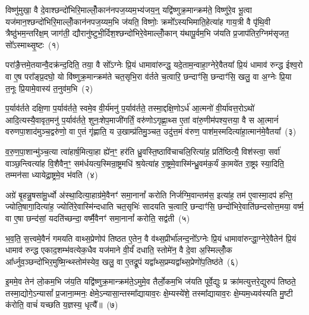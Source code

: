 \setcounter{anuvakam}{0}
विष्णु॑मुखा॒ वै दे॒वाश्छन्दो॑भिरि॒माल्लोँ॒कान॑नपज॒य्यम॒भ्य॑जय॒न्॒ यद्वि॑ष्णुक्र॒मान्क्रम॑ते॒ विष्णु॑रे॒व भू॒त्वा यज॑मान॒श्छन्दो॑भिरि॒माल्लोँ॒कान॑नपज॒य्यम॒भि ज॑यति॒ विष्णोः॒ क्रमो᳚\-ऽस्यभिमाति॒हेत्या॑ह गाय॒त्री वै पृ॑थि॒वी त्रैष्ठु॑भम॒न्तरि॑क्ष॒म् जाग॑ती॒ द्यौरानु॑ष्टुभी॒र्दिश॒श्छन्दो॑भिरे॒वेमाल्लोँ॒कान् य॑थापू॒र्वम॒भि ज॑यति प्र॒जाप॑तिर॒ग्निम॑सृजत॒ सो᳚\-ऽस्माथ्सृ॒ष्टः~(१)

परा॑ङै॒त्तमे॒तयान्वै॒दक्र॑न्द॒दिति॒ तया॒ वै सो᳚\-ऽग्नेः प्रि॒यं धामावा॑रुन्द्ध॒ यदे॒ताम॒न्वाहा॒ग्नेरे॒वैतया᳚ प्रि॒यं धामाव॑ रुन्द्ध ईश्व॒रो वा ए॒ष परा᳚ङ्प्र॒दघो॒ यो वि॑ष्णुक्र॒मान्क्रम॑ते चत॒सृभि॒रा व॑र्तते च॒त्वारि॒ छन्दाꣳ॑सि॒ छन्दाꣳ॑सि॒ खलु॒ वा अ॒ग्नेः प्रि॒या त॒नूः प्रि॒यामे॒वास्य॑ त॒नुव॑म॒भि~(२)

प॒र्याव॑र्तते दक्षि॒णा प॒र्याव॑र्तते॒ स्वमे॒व वी॒र्य॑मनु॑ प॒र्याव॑र्तते॒ तस्मा॒द्दक्षि॒णो\-ऽर्ध॑ आ॒त्मनो॑ वी॒र्या॑वत्त॒रो\-ऽथो॑ आदि॒त्यस्यै॒वावृत॒मनु॑ प॒र्याव॑र्तते॒ शुनः॒शेप॒माजी॑गर्तिं॒ वरु॑णो\-ऽगृह्णा॒थ्स ए॒तां वा॑रु॒णीम॑पश्य॒त्तया॒ वै स आ॒त्मानं॑ वरुणपा॒शाद॑मुञ्च॒द्वरु॑णो॒ वा ए॒तं गृ॑ह्णाति॒ य उ॒खाम्प्र॑तिमु॒ञ्चत॒ उदु॑त्त॒मं व॑रुण॒ पाश॑म॒स्मदित्या॑हा॒त्मान॑मे॒वैतया᳚~(३)

व॒रु॒ण॒पा॒शान्मु॑ञ्च॒त्या त्वा॑हार्\mbox{}ष॒मित्या॒हा ह्ये॑न॒ꣳ॒ हर॑ति ध्रु॒वस्ति॒ष्ठावि॑चाचलि॒रित्या॑ह॒ प्रति॑ष्ठित्यै॒ विश॑स्त्वा॒ सर्वा॑ वाञ्छ॒न्त्वित्या॑ह वि॒शैवैन॒ꣳ॒ सम॑र्धयत्य॒स्मिन्रा॒ष्ट्रमधि॑ श्र॒येत्या॑ह रा॒ष्ट्रमे॒वास्मि॑न्ध्रु॒वम॑क॒र्यं का॒मये॑त रा॒ष्ट्रꣴ स्या॒दिति॒ तम्मन॑सा ध्यायेद्रा॒ष्ट्रमे॒व भ॑वति~(४)

अग्रे॑ बृ॒हन्नु॒षसा॑मू॒र्ध्वो अ॑स्था॒दित्या॒हाग्र॑मे॒वैनꣳ॑ समा॒नानां᳚ करोति निर्जग्मि॒वान्तम॑स॒ इत्या॑ह॒ तम॑ ए॒वास्मा॒दप॑ हन्ति॒ ज्योति॒षागा॒दित्या॑ह॒ ज्योति॑रे॒वास्मि॑न्दधाति चत॒सृभिः॑ सादयति च॒त्वारि॒ छन्दाꣳ॑सि॒ छन्दो॑भिरे॒वाति॑छन्दसोत्त॒मया॒ वर्ष्म॒ वा ए॒षा छन्द॑सां॒ यदति॑च्छन्दा॒ वर्ष्मै॒वैनꣳ॑ समा॒नानां᳚ करोति॒ सद्व॑ती~(५)

भ॒व॒ति॒ स॒त्त्वमे॒वैनं॑ गमयति वाथ्स॒प्रेणोप॑ तिष्ठत ए॒तेन॒ वै व॑थ्स॒प्रीर्भा॑लन्द॒नो᳚\-ऽग्नेः प्रि॒यं धामावा॑रुन्द्धा॒ग्नेरे॒वैतेन॑ प्रि॒यं धामाव॑ रुन्द्ध एकाद॒शम्भ॑वत्येक॒धैव यज॑माने वी॒र्यं॑ दधाति॒ स्तोमे॑न॒ वै दे॒वा अ॒स्मिल्लोँ॒क आ᳚र्ध्नुव॒ञ्छन्दो॑भिर॒मुष्मि॒न्थ्स्तोम॑स्येव॒ खलु॒ वा ए॒तद्रू॒पं यद्वा᳚थ्स॒प्रम्यद्वा᳚थ्स॒प्रेणो॑प॒तिष्ठ॑ते~(६)

इ॒ममे॒व तेन॑ लो॒कम॒भि ज॑य॒ति यद्वि॑ष्णुक्र॒मान्क्रम॑ते॒\-ऽमुमे॒व तैर्लो॒कम॒भि ज॑यति पूर्वे॒द्युः प्र क्रा॑मत्युत्तरे॒द्युरुप॑ तिष्ठते॒ तस्मा॒द्योगे॒\-ऽन्यासां᳚ प्र॒जाना॒म्मनः॒ क्षेमे॒\-ऽन्यासा॒न्तस्मा᳚द्यायाव॒रः क्षे॒म्यस्ये॑शे॒ तस्मा᳚द्यायाव॒रः क्षे॒म्यम॒ध्यव॑स्यति मु॒ष्टी क॑रोति॒ वाचं॑ यच्छति य॒ज्ञस्य॒ धृत्यै᳚॥~(७)

